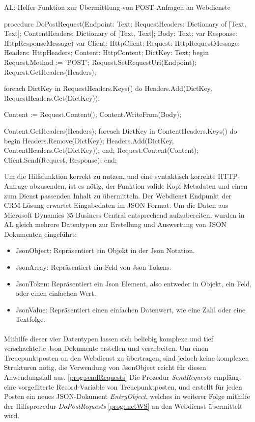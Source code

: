 \begin{program}  %
	\centering
	\caption{AL: Helfer Funktion zur Übermittlung von POST-Anfragen an Webdienste}
	\label{prog:wsHelper}
	
	\begin{JavaCode}
procedure DoPostRequest(Endpoint: Text;
                        RequestHeaders: Dictionary of [Text, Text];
                        ContentHeaders: Dictionary of [Text, Text];
                        Body: Text;
                        var Response: HttpResponseMessage)
var
  Client: HttpClient;
  Request: HttpRequestMessage;
  Headers: HttpHeaders;
  Content: HttpContent;
  DictKey: Text;
begin
  Request.Method := 'POST';
  Request.SetRequestUri(Endpoint);
  Request.GetHeaders(Headers);

  foreach DictKey in RequestHeaders.Keys() do
    Headers.Add(DictKey, RequestHeaders.Get(DictKey));

  Content := Request.Content();
  Content.WriteFrom(Body);

  Content.GetHeaders(Headers);
  foreach DictKey in ContentHeaders.Keys() do begin
    Headers.Remove(DictKey);
    Headers.Add(DictKey, ContentHeaders.Get(DictKey));
  end;
  Request.Content(Content);
  Client.Send(Request, Response);
end;
	\end{JavaCode}
\end{program}
\pagebreak

Um die Hilfsfunktion korrekt zu nutzen, und eine syntaktisch korrekte HTTP-Anfrage abzusenden, ist es nötig, der Funktion valide Kopf-Metadaten und einen zum Dienst passenden Inhalt zu übermitteln. Der Webdienst Endpunkt der CRM-Lösung erwartet Eingabedaten im JSON Format. Um die Daten aus Microsoft Dynamics 35 Business Central entsprechend aufzubereiten, wurden in AL gleich mehrere Datentypen zur Erstellung und Auswertung von JSON Dokumenten eingeführt: 
\begin{itemize}
	\item JsonObject: Repräsentiert ein Objekt in der Json Notation.
	\item JsonArray: Repräsentiert ein Feld von Json Tokens.
	\item JsonToken: Repräsentiert ein Json Element, also entweder in Objekt, ein Feld, oder einen einfachen Wert.
	\item JsonValue: Repräsentiert einen einfachen Datenwert, wie eine Zahl oder eine Textfolge.
\end{itemize}
\paragraph{}
Mithilfe dieser vier Datentypen lassen sich beliebig komplexe und tief verschachtelte Json Dokumente erstellen und verarbeiten. Um einen Treuepunktposten an den Webdienst zu übertragen, sind jedoch keine komplexen Strukturen nötig, die Verwendung von JsonObject reicht für diesen Anwendungsfall aus. \ref{prog:sendRequests} Die Prozedur \textit{SendRequests} empfängt eine vorgefilterte Record-Variable von Treuepunktposten, und erstellt für jeden Posten ein neues JSON-Dokument \textit{EntryObject}, welches in weiterer Folge mithilfe der Hilfsprozedur \textit{DoPostRequests} \ref{prog:.netWS} an den Webdienst übermittelt wird.


